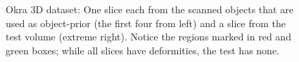 \documentclass[journal]{IEEEtran}
\begin{document}
\begin{figure}[!h]
\begin{subfigure}[b]{0.18\linewidth}
\captionsetup{labelformat=empty}       
 \caption{}
    \end{subfigure}
     \begin{subfigure}[b]{0.176\linewidth}
\captionsetup{labelformat=empty}
        \caption{}
    \end{subfigure}
     \caption{Okra 3D dataset: One slice each from the scanned objects that are used as object-prior (the first four from left) and a slice from the test 
        volume (extreme right). Notice the regions marked in red and green boxes; while all slices have deformities, the test has none.}
\label{fig:object-prior_test_okra}
\end{figure}
\end{document}

